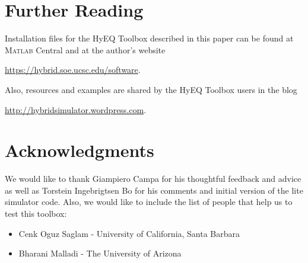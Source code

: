 \documentclass{article}
\newcommand{\matlab}{\textsc{Matlab}}
\begin{document}







\section{Further Reading}
\label{sec:closingremarks}
\noindent Installation files for the HyEQ Toolbox described in this paper can be found at \matlab{} Central and at the author's website
\begin{center}
\url{https://hybrid.soe.ucsc.edu/software}.
\end{center}
Also, resources and examples are shared by the HyEQ Toolbox users in the blog
\begin{center}
\url{http://hybridsimulator.wordpress.com}.
\end{center}

\section{Acknowledgments}
\label{sec:acknowledgments}

We would like to thank Giampiero Campa for his thoughtful feedback and advice as well as Torstein Ingebrigtsen Bo for his comments and initial version of the lite simulator code.
%
Also, we would like to include the list of people that help us to test this toolbox:

\begin{itemize}
\item Cenk Oguz Saglam - University of California, Santa Barbara
\item Bharani Malladi - The University of Arizona
\end{itemize}



 
\label{sec:refs}

%

   
\end{document}

